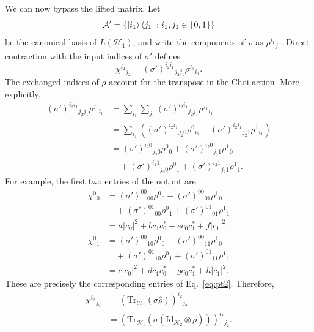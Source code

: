 \documentclass[
    aps,
    pra,
    reprint,
    superscriptaddress,
    nofootinbib
]{revtex4-2}
\theoremstyle{definition}
\theoremstyle{plain}
\begin{document}
We can now bypass the lifted matrix. Let
\begin{equation}
    \mathcal{A}'
    =
    \left\{
        \ket{i_{1}}\bra{j_{1}}
        :
        i_{1},j_{1}\in\{0,1\}
    \right\}
\end{equation}
be the canonical basis of $L(\mathcal{H}_{1})$, and write the
components of $\rho$ as $\rho^{i_{1}}{}_{j_{1}}$. Direct contraction
with the input indices of $\sigma'$ defines
\begin{equation}
    \chi^{i_{2}}{}_{j_{2}}
    =
    (\sigma')^{i_{2}i_{1}}{}_{j_{2}j_{1}}
    \rho^{j_{1}}{}_{i_{1}}.
\end{equation}
The exchanged indices of $\rho$ account for the transpose in the Choi
action. More explicitly,
\begin{align}
    (\sigma')^{i_{2}i_{1}}{}_{j_{2}j_{1}}
    \rho^{j_{1}}{}_{i_{1}}
    &=
    \sum_{i_{1}}\sum_{j_{1}}
    (\sigma')^{i_{2}i_{1}}{}_{j_{2}j_{1}}
    \rho^{j_{1}}{}_{i_{1}}\\
    &=
    \sum_{i_{1}}
    \left(
        (\sigma')^{i_{2}i_{1}}{}_{j_{2}0}
        \rho^{0}{}_{i_{1}}
        +
        (\sigma')^{i_{2}i_{1}}{}_{j_{2}1}
        \rho^{1}{}_{i_{1}}
    \right)\\
    &=
    (\sigma')^{i_{2}0}{}_{j_{2}0}\rho^{0}{}_{0}
    +
    (\sigma')^{i_{2}0}{}_{j_{2}1}\rho^{1}{}_{0}
    \nonumber\\
    &\quad+
    (\sigma')^{i_{2}1}{}_{j_{2}0}\rho^{0}{}_{1}
    +
    (\sigma')^{i_{2}1}{}_{j_{2}1}\rho^{1}{}_{1}.
\end{align}
For example, the first two entries of the output are
\begin{align}
    \chi^{0}{}_{0}
    &=
    (\sigma')^{00}{}_{00}\rho^{0}{}_{0}
    +
    (\sigma')^{00}{}_{01}\rho^{1}{}_{0}
    \nonumber\\
    &\quad+
    (\sigma')^{01}{}_{00}\rho^{0}{}_{1}
    +
    (\sigma')^{01}{}_{01}\rho^{1}{}_{1}\\
    &=
    a|c_{0}|^{2}
    +bc_{1}c_{0}^{*}
    +ec_{0}c_{1}^{*}
    +f|c_{1}|^{2},\\
    \chi^{0}{}_{1}
    &=
    (\sigma')^{00}{}_{10}\rho^{0}{}_{0}
    +
    (\sigma')^{00}{}_{11}\rho^{1}{}_{0}
    \nonumber\\
    &\quad+
    (\sigma')^{01}{}_{10}\rho^{0}{}_{1}
    +
    (\sigma')^{01}{}_{11}\rho^{1}{}_{1}\\
    &=
    c|c_{0}|^{2}
    +dc_{1}c_{0}^{*}
    +gc_{0}c_{1}^{*}
    +h|c_{1}|^{2}.
\end{align}
These are precisely the corresponding entries of Eq.~\eqref{eq:pt2}.
Therefore,
\begin{equation}
    \begin{aligned}
    \chi^{i_{2}}{}_{j_{2}}
    &=
    \left(
        \mathrm{Tr}_{\mathcal{H}_{1}}
        (\sigma\hat{\rho})
    \right)^{i_{2}}{}_{j_{2}}\\
    &=
    \left(
        \mathrm{Tr}_{\mathcal{H}_{1}}
        \left(
            \sigma
            (\mathrm{Id}_{\mathcal{H}_{2}}\otimes\rho)
        \right)
    \right)^{i_{2}}{}_{j_{2}}.
    \end{aligned}
\end{equation}
\end{document}
